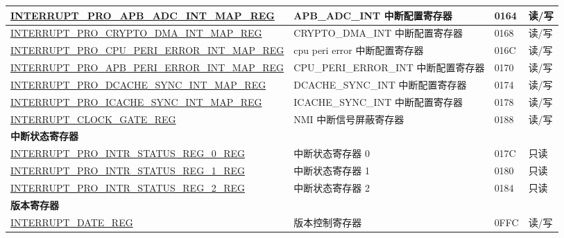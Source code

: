 \begin{longtable}{ | m{9.3cm} | m{9.2cm} | m{1.3cm} | m{1.2cm} | }
\hyperref[regdesc:INTERRUPTPROAPBADCINTMAPREG]{INTERRUPT\_PRO\_APB\_ADC\_INT\_MAP\_REG} & APB\_ADC\_INT 中断配置寄存器 & \hexprefix{}0164 &读/写 \\ \hline
\hyperref[regdesc:INTERRUPTPROCRYPTODMAINTMAPREG]{INTERRUPT\_PRO\_CRYPTO\_DMA\_INT\_MAP\_REG} & CRYPTO\_DMA\_INT 中断配置寄存器 & \hexprefix{}0168 &读/写 \\ \hline
\hyperref[regdesc:INTERRUPTPROCPUPERIERRORINTMAPREG]{INTERRUPT\_PRO\_CPU\_PERI\_ERROR\_INT\_MAP\_REG} & cpu peri error 中断配置寄存器 & \hexprefix{}016C &读/写 \\ \hline
\hyperref[regdesc:INTERRUPTPROAPBPERIERRORINTMAPREG]{INTERRUPT\_PRO\_APB\_PERI\_ERROR\_INT\_MAP\_REG} & CPU\_PERI\_ERROR\_INT 中断配置寄存器 & \hexprefix{}0170 &读/写 \\ \hline
\hyperref[regdesc:INTERRUPTPRODCACHESYNCINTMAPREG]{INTERRUPT\_PRO\_DCACHE\_SYNC\_INT\_MAP\_REG} & DCACHE\_SYNC\_INT 中断配置寄存器 & \hexprefix{}0174 &读/写 \\ \hline
\hyperref[regdesc:INTERRUPTPROICACHESYNCINTMAPREG]{INTERRUPT\_PRO\_ICACHE\_SYNC\_INT\_MAP\_REG} & ICACHE\_SYNC\_INT 中断配置寄存器 & \hexprefix{}0178 &读/写 \\ \hline
\hyperref[regdesc:INTERRUPTCLOCKGATEREG]{INTERRUPT\_CLOCK\_GATE\_REG} & NMI 中断信号屏蔽寄存器 & \hexprefix{}0188 &读/写 \\ \hline
\multicolumn{4}{|l|}{\textbf{中断状态寄存器}} \\ \hline
\hyperref[regdesc:INTERRUPTPROINTRSTATUSREG0REG]{INTERRUPT\_PRO\_INTR\_STATUS\_REG\_0\_REG} & 中断状态寄存器 0 & \hexprefix{}017C & 只读 \\ \hline
\hyperref[regdesc:INTERRUPTPROINTRSTATUSREG1REG]{INTERRUPT\_PRO\_INTR\_STATUS\_REG\_1\_REG} & 中断状态寄存器 1 & \hexprefix{}0180 & 只读 \\ \hline
\hyperref[regdesc:INTERRUPTPROINTRSTATUSREG2REG]{INTERRUPT\_PRO\_INTR\_STATUS\_REG\_2\_REG} & 中断状态寄存器 2 & \hexprefix{}0184 & 只读 \\ \hline
\multicolumn{4}{|l|}{\textbf{版本寄存器}} \\ \hline
\hyperref[regdesc:INTERRUPTREGDATEREG]{INTERRUPT\_DATE\_REG} & 版本控制寄存器 & \hexprefix{}0FFC &读/写 \\ \hline
\end{longtable}

